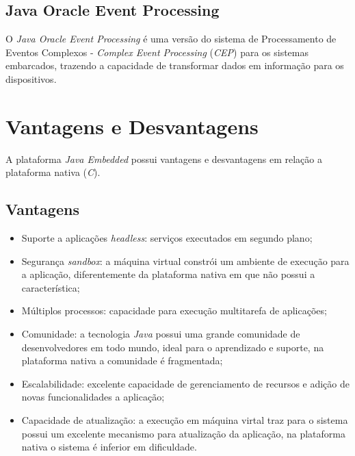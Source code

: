 \subsection{Java Oracle Event Processing}

O \textit{Java Oracle Event Processing} é uma versão do sistema de
Processamento de Eventos Complexos - \textit{Complex Event Processing}
(\textit{CEP}) para os sistemas embarcados, trazendo a capacidade de
transformar dados em informação para os dispositivos.

\section{Vantagens e Desvantagens}

A plataforma \textit{Java Embedded} possui vantagens e desvantagens em relação
a plataforma nativa (\textit{C}).

\subsection{Vantagens}

\begin{itemize}

	\item Suporte a aplicações \textit{headless}: serviços executados em
	segundo plano;

	\item Segurança \textit{sandbox}: a máquina virtual constrói um ambiente de
	execução para a aplicação, diferentemente da plataforma nativa em que não
	possui a característica;

	\item Múltiplos processos: capacidade para execução multitarefa de
	aplicações;

	\item Comunidade: a tecnologia \textit{Java} possui uma grande comunidade
	de desenvolvedores em todo mundo, ideal para o aprendizado e suporte, na
	plataforma nativa a comunidade é fragmentada;

	\item Escalabilidade: excelente capacidade de gerenciamento de recursos e
	adição de novas funcionalidades a aplicação;

	\item Capacidade de atualização: a execução em máquina virtal traz para o
	sistema possui um excelente mecanismo para atualização da aplicação, na
	plataforma nativa o sistema é inferior em dificuldade.

\end{itemize}

